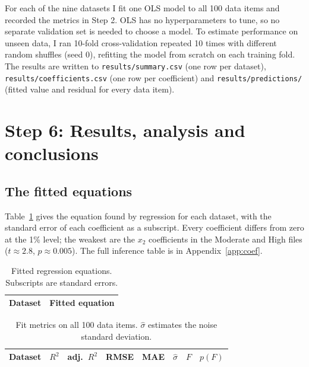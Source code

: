 \documentclass[11pt]{article}
\begin{document}
For each of the nine datasets I fit one OLS model to all 100 data items and recorded the metrics in Step 2. OLS has no hyperparameters to tune, so no separate validation set is needed to choose a model. To estimate performance on unseen data, I ran 10-fold cross-validation repeated 10 times with different random shuffles (seed 0), refitting the model from scratch on each training fold. The results are written to \texttt{results/summary.csv} (one row per dataset), \texttt{results/coefficients.csv} (one row per coefficient) and \texttt{results/predictions/} (fitted value and residual for every data item).

\section{Step 6: Results, analysis and conclusions}

\subsection{The fitted equations}

Table~\ref{tab:eq} gives the equation found by regression for each dataset, with the standard error of each coefficient as a subscript. Every coefficient differs from zero at the 1\% level; the weakest are the $x_2$ coefficients in the Moderate and High files ($t \approx 2.8$, $p \approx 0.005$). The full inference table is in Appendix~\ref{app:coef}.

\begin{table}[H]\centering\small
\caption{Fitted regression equations. Subscripts are standard errors.}
\label{tab:eq}
\begin{tabular}{ll}
\toprule
Dataset & Fitted equation\\
\midrule

\bottomrule
\end{tabular}
\end{table}

\begin{table}[H]\centering\small
\caption{Fit metrics on all 100 data items. $\hat\sigma$ estimates the noise standard deviation.}
\label{tab:metrics}
\begin{tabular}{lccccccc}
\toprule
Dataset & $R^2$ & adj.\ $R^2$ & RMSE & MAE & $\hat\sigma$ & $F$ & $p(F)$\\
\midrule

\bottomrule
\end{tabular}
\end{table}
\end{document}
